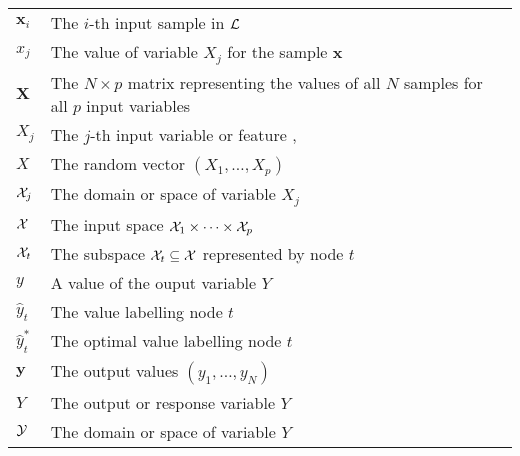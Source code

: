 \begin{tabularx}{\textwidth}{ l X }
$\textbf{x}_i$ & The $i$-th input sample in ${\cal L}$ \dotfill  \pageref{ntn:sample-x_i}\\
$x_j$ & The value of variable $X_j$ for the sample $\textbf{x}$ \dotfill  \pageref{ntn:value-x_j}\\
$\textbf{X}$ & The $N\times p$ matrix representing the values of all $N$ samples for all $p$ input variables \dotfill  \pageref{ntn:matrix-X}\\
$X_j$ & The $j$-th input variable or feature \dotfill  \pageref{ntn:var-X_j}, \pageref{ntn:var-X_j2}\\
$X$ & The random vector $(X_1,\dots,X_p)$ \dotfill  \pageref{ntn:vector-X}\\
${\cal X}_j$ & The domain or space of variable $X_j$ \dotfill  \pageref{ntn:space-X_j}\\
${\cal X}$ & The input space ${\cal X}_1 \times \dots \times {\cal X}_p$ \dotfill  \pageref{ntn:space-X}\\
${\cal X}_t$ & The subspace ${\cal X}_t \subseteq {\cal X}$ represented by node $t$ \dotfill  \pageref{ntn:node-space}\\
$y$ & A value of the ouput variable $Y$ \dotfill  \pageref{ntn:value-y}\\
$\widehat{y}_t$ & The value labelling node $t$ \dotfill  \pageref{ntn:y_t}\\
$\widehat{y}_t^*$ & The optimal value labelling node $t$ \dotfill  \pageref{ntn:y_t-star}\\
$\mathbf{y}$ & The output values $(y_1,\dots,y_N)$ \dotfill  \pageref{ntn:vector-y}\\
$Y$ & The output or response variable $Y$ \dotfill  \pageref{ntn:var-Y}\\
${\cal Y}$ & The domain or space of variable $Y$ \dotfill  \pageref{ntn:space-Y}\\
\end{tabularx}
